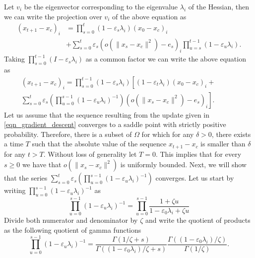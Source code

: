 \documentclass[article]{IEEEtran}
\theoremstyle{definition}
\begin{document}
%
Let $v_i$ be the eigenvector corresponding to the eigenvalue $\lambda_i$ of the Hessian, then we can write the projection over $v_i$ of the above equation as
%
\begin{equation}
\begin{split}
(x_{t+1} - x_c)_{i} &= \prod_{s=0}^t (1-\varepsilon_s\lambda_i) (x_0-x_c)_{i}\\
&+\sum_{s=0}^t\varepsilon_s\left( o(\|x_s-x_{c}\|^2) -e_s\right)_{i}\prod_{u=s}^{t-1} \left(1 -\varepsilon_u  \lambda_i\right).
\end{split}
\end{equation}
%
Taking $\prod_{s=0}^{t-1} (I-\varepsilon_s\lambda_i) $ as a common factor we can write the above equation as
%
\begin{equation}\label{eqn_key_equation}
\begin{split}
(x_{t+1} - x_c)_{i} = \prod_{s=0}^{t-1} (1-\varepsilon_s\lambda_i) \left[(1-\varepsilon_t\lambda_i)(x_0-x_c)_{i}+ \phantom{\sum_{s=0}^t}\right.\\
\left.\sum_{s=0}^t\varepsilon_s\left(\prod_{u=0}^{s-1} (1 -\varepsilon_u  \lambda_i)^{-1}\right)\left( o(\|x_s-x_{c}\|^2) -e_s\right)_{i}\right].
\end{split}
\end{equation}
%
Let us assume that the sequence resulting from the update given in \eqref{eqn_gradient_descent} converges to a saddle point with strictly positive probability. Therefore, there is a subset of $\Omega$ for which for any $\delta>0$, there exists a time $T$ such that the absolute value of the sequence $x_{t+1}-x_c$ is smaller than $\delta$ for any $t>T$. Without loss of generality let $T=0$. This implies that for every $s\geq0$ we have that $o(\|x_s-x_c\|^2)$ is uniformly bounded. Next, we will show that the series $\sum_{s=0}^t\varepsilon_s\left(\prod_{u=0}^{s-1} (1 -\varepsilon_u  \lambda_i)^{-1}\right)$ converges. Let us start by writing $\prod_{u=0}^{s-1} (1 -\varepsilon_u  \lambda_i)^{-1}$ as
%
\begin{equation}
\prod_{u=0}^{s-1} (1 -\varepsilon_u  \lambda_i)^{-1} = \prod_{u=0}^{s-1} \frac{1+\zeta  u}{1-\varepsilon_0\lambda_i + \zeta u}
\end{equation}
%
Divide both numerator and denominator by $\zeta$ and write the quotient of products as the following quotient of gamma functions 
%
\begin{equation}\label{eqn_aux_product}
\prod_{u=0}^{s-1} (1 -\varepsilon_u  \lambda_i)^{-1} = \frac{\Gamma(1/\zeta+s)}{\Gamma((1-\varepsilon_0\lambda_i)/\zeta+s)}\frac{\Gamma((1-\varepsilon_0\lambda_i)/\zeta)}{\Gamma(1/\zeta)}.
\end{equation}
\end{document}
